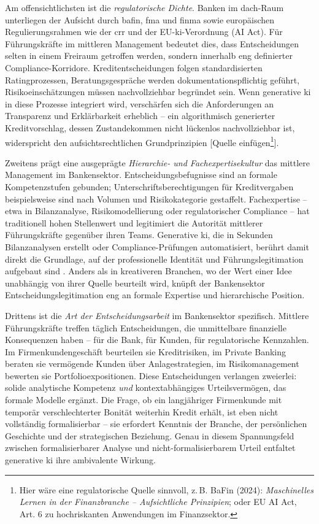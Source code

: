 Am offensichtlichsten ist die \textit{regulatorische Dichte}. Banken im \acrshort{dach}-Raum unterliegen der Aufsicht durch \gls{bafin}, \gls{fma} und \gls{finma} sowie europäischen Regulierungsrahmen wie der \gls{crr} und der EU-\acrshort{ki}-Verordnung (AI Act). Für Führungskräfte im mittleren Management bedeutet dies, dass Entscheidungen selten in einem Freiraum getroffen werden, sondern innerhalb eng definierter Compliance-Korridore. Kreditentscheidungen folgen standardisierten Ratingprozessen, Beratungsgespräche werden dokumentationspflichtig geführt, Risikoeinschätzungen müssen nachvollziehbar begründet sein. Wenn generative \gls{ki} in diese Prozesse integriert wird, verschärfen sich die Anforderungen an Transparenz und Erklärbarkeit erheblich -- ein algorithmisch generierter Kreditvorschlag, dessen Zustandekommen nicht lückenlos nachvollziehbar ist, widerspricht den aufsichtsrechtlichen Grundprinzipien [Quelle einfügen\footnote{Hier wäre eine regulatorische Quelle sinnvoll, z.\,B. BaFin (2024): \textit{Maschinelles Lernen in der Finanzbranche -- Aufsichtliche Prinzipien}; oder EU AI Act, Art. 6 zu hochriskanten Anwendungen im Finanzsektor.}].

Zweitens prägt eine ausgeprägte \textit{Hierarchie- und Fachexpertisekultur} das mittlere Management im Bankensektor. Entscheidungsbefugnisse sind an formale Kompetenzstufen gebunden; Unterschriftsberechtigungen für Kreditvergaben beispielsweise sind nach Volumen und Risikokategorie gestaffelt. Fachexpertise -- etwa in Bilanzanalyse, Risikomodellierung oder regulatorischer Compliance -- hat traditionell hohen Stellenwert und legitimiert die Autorität mittlerer Führungskräfte gegenüber ihren Teams. Generative \gls{ki}, die in Sekunden Bilanzanalysen erstellt oder Compliance-Prüfungen automatisiert, berührt damit direkt die Grundlage, auf der professionelle Identität und Führungslegitimation aufgebaut sind \parencite{quaquebekeNowNewNext2023}. Anders als in kreativeren Branchen, wo der Wert einer Idee unabhängig von ihrer Quelle beurteilt wird, knüpft der Bankensektor Entscheidungslegitimation eng an formale Expertise und hierarchische Position.

Drittens ist die \textit{Art der Entscheidungsarbeit} im Bankensektor spezifisch. Mittlere Führungskräfte treffen täglich Entscheidungen, die unmittelbare finanzielle Konsequenzen haben -- für die Bank, für Kunden, für regulatorische Kennzahlen. Im Firmenkundengeschäft beurteilen sie Kreditrisiken, im Private Banking beraten sie vermögende Kunden über Anlagestrategien, im Risikomanagement bewerten sie Portfolioexpositionen. Diese Entscheidungen verlangen zweierlei: solide analytische Kompetenz \textit{und} kontextabhängiges Urteilsvermögen, das formale Modelle ergänzt. Die Frage, ob ein langjähriger Firmenkunde mit temporär verschlechterter Bonität weiterhin Kredit erhält, ist eben nicht vollständig formalisierbar -- sie erfordert Kenntnis der Branche, der persönlichen Geschichte und der strategischen Beziehung. Genau in diesem Spannungsfeld zwischen formalisierbarer Analyse und nicht-formalisierbarem Urteil entfaltet generative \gls{ki} ihre ambivalente Wirkung.

